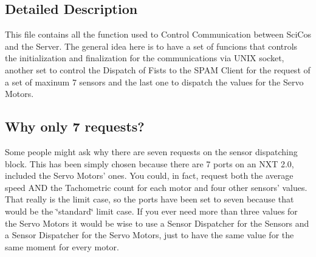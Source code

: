 \subsection{Detailed Description}
This file contains all the function used to Control Communication between SciCos and the Server. The general idea here is to have a set of funcions that controls the initialization and finalization for the communications via UNIX socket, another set to control the Dispatch of Fists to the SPAM Client for the request of a set of maxinum 7 sensors and the last one to dispatch the values for the Servo Motors.\hypertarget{group___b_r_o_cos_comm_Why7}{}\subsection{Why only 7 requests?}\label{group___b_r_o_cos_comm_Why7}
Some people might ask why there are seven requests on the sensor dispatching block. This has been simply chosen because there are 7 ports on an NXT 2.0, included the Servo Motors' ones. You could, in fact, request both the average speed AND the Tachometric count for each motor and four other sensors' values. That really is the limit case, so the ports have been set to seven because that would be the \char`\"{}standard\char`\"{} limit case. If you ever need more than three values for the Servo Motors it would be wise to use a Sensor Dispatcher for the Sensors and a Sensor Dispatcher for the Servo Motors, just to have the same value for the same moment for every motor. 